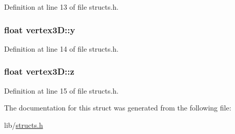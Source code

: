 Definition at line 13 of file structs.\+h.

\subsubsection[{\texorpdfstring{y}{y}}]{\setlength{\rightskip}{0pt plus 5cm}float vertex3\+D\+::y}\hypertarget{structvertex3_d_aa1f4823bf2a3f648b1b0b39ef7ea5891}{}\label{structvertex3_d_aa1f4823bf2a3f648b1b0b39ef7ea5891}


Definition at line 14 of file structs.\+h.

\subsubsection[{\texorpdfstring{z}{z}}]{\setlength{\rightskip}{0pt plus 5cm}float vertex3\+D\+::z}\hypertarget{structvertex3_d_a67f3819dff895cb47284c34ec85658d7}{}\label{structvertex3_d_a67f3819dff895cb47284c34ec85658d7}


Definition at line 15 of file structs.\+h.



The documentation for this struct was generated from the following file\+:\begin{DoxyCompactItemize}
\item 
lib/\hyperlink{structs_8h}{structs.\+h}\end{DoxyCompactItemize}
